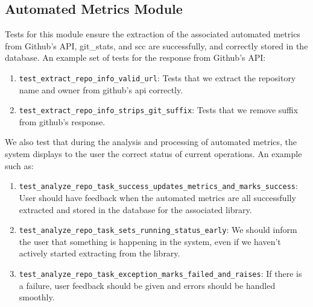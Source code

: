 \documentclass[12pt, titlepage]{article}
\begin{document}
\subsection{Automated Metrics Module}
  Tests for this module ensure the extraction of the associated automated metrics from Github's API, git\_stats, and scc are successfully, and correctly stored in the database.
  An example set of tests for the response from Github's API:
  \begin{enumerate}
    \item \texttt{test\_extract\_repo\_info\_valid\_url}: Tests that we extract the repository name and owner from github's api correctly.
    \item \texttt{test\_extract\_repo\_info\_strips\_git\_suffix}: Tests that we remove suffix from github's response.
  \end{enumerate}

  We also test that during the analysis and processing of automated metrics, the system displays to the user the correct status of current operations.
  An example such as:
  \begin{enumerate}
    \item \texttt{test\_analyze\_repo\_task\_success\_updates\_metrics\_and\_marks\_success}: User should have feedback when the automated metrics are all successfully extracted and stored in the database for the associated library.
    \item \texttt{test\_analyze\_repo\_task\_sets\_running\_status\_early}: We should inform the user that something is happening in the system, even if we haven't actively started extracting from the library.
    \item \texttt{test\_analyze\_repo\_task\_exception\_marks\_failed\_and\_raises}: If there is a failure, user feedback should be given and errors should be handled smoothly.
  \end{enumerate}
\end{document}
